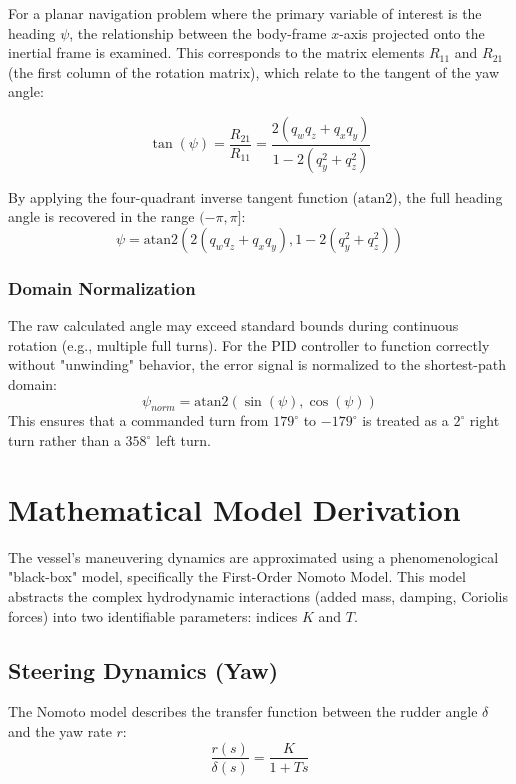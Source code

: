 \documentclass[12pt, a4paper, oneside]{report}
\begin{document}
For a planar navigation problem where the primary variable of interest is the heading $\psi$, the relationship between the body-frame $x$-axis projected onto the inertial frame is examined. This corresponds to the matrix elements $R_{11}$ and $R_{21}$ (the first column of the rotation matrix), which relate to the tangent of the yaw angle:

\begin{equation}
    \tan(\psi) = \frac{R_{21}}{R_{11}} = \frac{2(q_w q_z + q_x q_y)}{1 - 2(q_y^2 + q_z^2)}
\end{equation}

By applying the four-quadrant inverse tangent function ($\text{atan2}$), the full heading angle is recovered in the range $(-\pi, \pi]$:
\begin{equation}
    \psi = \text{atan2}\left( 2(q_w q_z + q_x q_y), 1 - 2(q_y^2 + q_z^2) \right)
\end{equation}

\subsubsection{Domain Normalization}
The raw calculated angle may exceed standard bounds during continuous rotation (e.g., multiple full turns). For the PID controller to function correctly without "unwinding" behavior, the error signal is normalized to the shortest-path domain:
\begin{equation}
    \psi_{norm} = \text{atan2}(\sin(\psi), \cos(\psi))
\end{equation}
This ensures that a commanded turn from $179^\circ$ to $-179^\circ$ is treated as a $2^\circ$ right turn rather than a $358^\circ$ left turn.

\section{Mathematical Model Derivation}
The vessel's maneuvering dynamics are approximated using a phenomenological "black-box" model, specifically the First-Order Nomoto Model. This model abstracts the complex hydrodynamic interactions (added mass, damping, Coriolis forces) into two identifiable parameters: indices $K$ and $T$.

\subsection{Steering Dynamics (Yaw)}
The Nomoto model describes the transfer function between the rudder angle $\delta$ and the yaw rate $r$:
\begin{equation}
    \frac{r(s)}{\delta(s)} = \frac{K}{1 + Ts}
\end{equation}
\end{document}
